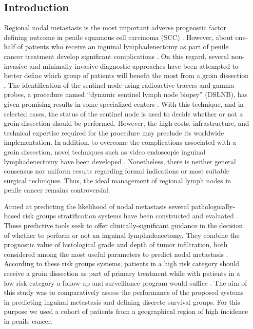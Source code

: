 \documentclass[11pt,letterpaper]{article}\usepackage[]{graphicx}\usepackage[]{color}
\begin{document}
\begin{multicols}{2}
\section*{Introduction}
Regional nodal metastasis is the most important adverse prognostic factor defining outcome in penile squamous cell carcinoma (SCC) \cite{Novara2007,Chaux2009}. However, about one-half of patients who receive an inguinal lymphadenectomy as part of penile cancer treatment develop significant complications \cite{Spiess2009}. On this regard, several non-invasive and minimally invasive diagnostic approaches have been attempted to better define which group of patients will benefit the most from a groin dissection \cite{Hughes2009}. The identification of the sentinel node using radioactive tracers and gamma-probes, a procedure named ``dynamic sentinel lymph node biopsy'' (DSLNB), has given promising results in some specialized centers \cite{Leijte2007}. With this technique, and in selected cases, the status of the sentinel node is used to decide whether or not a groin dissection should be performed. However, the high costs, infrastructure, and technical expertise required for the procedure may preclude its worldwide implementation. In addition, to overcome the complications associated with a groin dissection, novel techniques such as video endoscopic inguinal lymphadenectomy have been developed \cite{Sotelo2009}. Nonetheless, there is neither general consensus nor uniform results regarding formal indications or most suitable surgical techniques. Thus, the ideal management of regional lymph nodes in penile cancer remains controversial.

Aimed at predicting the likelihood of nodal metastasis several pathologically-based risk groups stratification systems have been constructed and evaluated \cite{Solsona2004,Solsona2001,Hungerhuber2006,Hegarty2006}. These predictive tools seek to offer clinically-significant guidance in the decision of whether to perform or not an inguinal lymphadenectomy. They combine the prognostic value of histological grade and depth of tumor infiltration, both considered among the most useful parameters to predict nodal metastasis \cite{Chaux2009,Velazquez2008,Slaton2001,Dai2006,Chaux2009b}. According to these risk groups systems, patients in a high risk category should receive a groin dissection as part of primary treatment while with patients in a low risk category a follow-up and surveillance program would suffice \cite{Solsona2004,Solsona2001,Hungerhuber2006}. The aim of this study was to comparatively assess the performance of the proposed systems in predicting inguinal metastasis and defining discrete survival groups. For this purpose we used a cohort of patients from a geographical region of high incidence in penile cancer.


\end{multicols}
\end{document}
